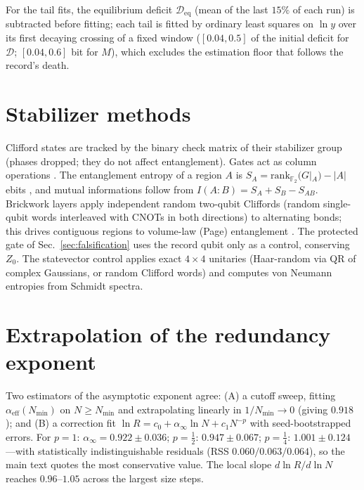 \documentclass[aps,pre,twocolumn,superscriptaddress,nofootinbib,longbibliography]{revtex4-2}
\begin{document}
For the tail fits, the equilibrium deficit $\mathcal D_{\mathrm{eq}}$ (mean of the last
$15\%$ of each run) is subtracted before fitting; each tail is fitted by ordinary least
squares on $\ln y$ over its first decaying crossing of a fixed window ($[0.04,0.5]$ of the
initial deficit for $\mathcal D$; $[0.04,0.6]$ bit for $M$), which excludes the estimation
floor that follows the record's death.

\section{Stabilizer methods}
\label{app:stabilizer}

Clifford states are tracked by the binary check matrix of their stabilizer group (phases
dropped; they do not affect entanglement). Gates act as column operations
\cite{gottesman1998,aaronsongottesman2004}. The entanglement entropy of a region $A$ is
$S_A=\mathrm{rank}_{\mathbb F_2}(G|_A)-|A|$ ebits \cite{fattal2004}, and mutual informations
follow from $I(A{:}B)=S_A+S_B-S_{AB}$. Brickwork layers apply independent random two-qubit
Cliffords (random single-qubit words interleaved with CNOTs in both directions) to
alternating bonds; this drives contiguous regions to volume-law (Page) entanglement
\cite{page1993,nahum2017}. The protected gate of Sec.~\ref{sec:falsification} uses the
record qubit only as a control, conserving $Z_0$. The statevector control applies exact
$4\times4$ unitaries (Haar-random via QR of complex Gaussians, or random Clifford words) and
computes von Neumann entropies from Schmidt spectra.

\section{Extrapolation of the redundancy exponent}
\label{app:extrapolation}

Two estimators of the asymptotic exponent agree: (A) a cutoff sweep, fitting
$\alpha_{\mathrm{eff}}(N_{\min})$ on $N\ge N_{\min}$ and extrapolating linearly in
$1/N_{\min}\to0$ (giving $0.918$); and (B) a correction fit
$\ln R=c_0+\alpha_\infty\ln N+c_1 N^{-p}$ with seed-bootstrapped errors. For $p=1$:
$\alpha_\infty=0.922\pm0.036$; $p=\tfrac12$: $0.947\pm0.067$; $p=\tfrac14$:
$1.001\pm0.124$---with statistically indistinguishable residuals (RSS
$0.060/0.063/0.064$), so the main text quotes the most conservative value. The local slope
$d\ln R/d\ln N$ reaches $0.96$--$1.05$ across the largest size steps.


\end{document}

